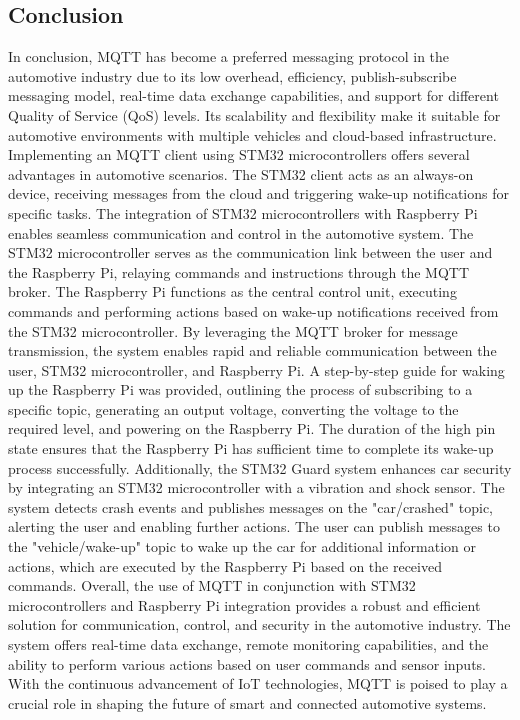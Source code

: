 \documentclass[
12pt,
oneside, 
onehalfspacing, 
nolistspacing, 
parskip, 
chapterinoneline, 
]{AASTCOMPUTER}
\begin{document}
\subsection{Conclusion}
In conclusion, MQTT has become a preferred messaging protocol in the automotive industry due to its low overhead, efficiency, publish-subscribe messaging model, real-time data exchange capabilities, and support for different Quality of Service (QoS) levels. Its scalability and flexibility make it suitable for automotive environments with multiple vehicles and cloud-based infrastructure. Implementing an MQTT client using STM32 microcontrollers offers several advantages in automotive scenarios. The STM32 client acts as an always-on device, receiving messages from the cloud and triggering wake-up notifications for specific tasks. The integration of STM32 microcontrollers with Raspberry Pi enables seamless communication and control in the automotive system. The STM32 microcontroller serves as the communication link between the user and the Raspberry Pi, relaying commands and instructions through the MQTT broker. The Raspberry Pi functions as the central control unit, executing commands and performing actions based on wake-up notifications received from the STM32 microcontroller. By leveraging the MQTT broker for message transmission, the system enables rapid and reliable communication between the user, STM32 microcontroller, and Raspberry Pi. A step-by-step guide for waking up the Raspberry Pi was provided, outlining the process of subscribing to a specific topic, generating an output voltage, converting the voltage to the required level, and powering on the Raspberry Pi. The duration of the high pin state ensures that the Raspberry Pi has sufficient time to complete its wake-up process successfully. Additionally, the STM32 Guard system enhances car security by integrating an STM32 microcontroller with a vibration and shock sensor. The system detects crash events and publishes messages on the "car/crashed" topic, alerting the user and enabling further actions. The user can publish messages to the "vehicle/wake-up" topic to wake up the car for additional information or actions, which are executed by the Raspberry Pi based on the received commands. Overall, the use of MQTT in conjunction with STM32 microcontrollers and Raspberry Pi integration provides a robust and efficient solution for communication, control, and security in the automotive industry. The system offers real-time data exchange, remote monitoring capabilities, and the ability to perform various actions based on user commands and sensor inputs. With the continuous advancement of IoT technologies, MQTT is poised to play a crucial role in shaping the future of smart and connected automotive systems.
\end{document}

